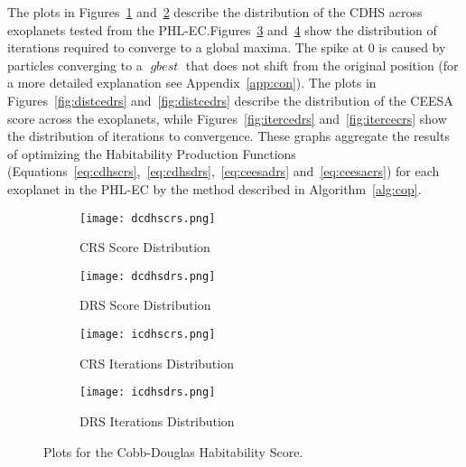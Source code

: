 \documentclass[9pt]{article}
\DeclareMathOperator*{\gbest}{\mathit{gbest}}
\begin{document}
The plots in Figures~\ref{fig:distcdcrs} and~\ref{fig:distcddrs} describe the distribution of the CDHS across exoplanets
tested from the PHL-EC.\@ Figures~\ref{fig:itercdcrs} and~\ref{fig:itercddrs} show the distribution of iterations
required to converge to a global maxima. The spike at 0 is caused by particles converging to a $\gbest$ that does not
shift from the original position (for a more detailed explanation see Appendix~\ref{app:con}). The plots in
Figures~\ref{fig:distcedrs} and~\ref{fig:distcedrs} describe the distribution of the CEESA score across the exoplanets,
while Figures~\ref{fig:itercedrs} and~\ref{fig:itercecrs} show the distribution of iterations to convergence. These
graphs aggregate the results of optimizing the Habitability Production Functions
(Equations~\ref{eq:cdhscrs},~\ref{eq:cdhsdrs},~\ref{eq:ceesadrs} and~\ref{eq:ceesacrs}) for each exoplanet in the PHL-EC
by the method described in Algorithm~\ref{alg:cop}.


\begin{figure}
  \centering
  \begin{subfigure}[b]{0.4\textwidth}
    \texttt{[image: dcdhscrs.png]}
    \caption{CRS Score Distribution}\label{fig:distcdcrs}
  \end{subfigure}
  \quad
  \begin{subfigure}[b]{0.4\textwidth}
    \texttt{[image: dcdhsdrs.png]}
    \caption{DRS Score Distribution}\label{fig:distcddrs}
  \end{subfigure}

  \begin{subfigure}[b]{0.4\textwidth}
    \texttt{[image: icdhscrs.png]}
    \caption{CRS Iterations Distribution}\label{fig:itercdcrs}
  \end{subfigure}
  \quad
  \begin{subfigure}[b]{0.4\textwidth}
    \texttt{[image: icdhsdrs.png]}
    \caption{DRS Iterations Distribution}\label{fig:itercddrs}
  \end{subfigure}
  \caption{Plots for the Cobb-Douglas Habitability Score.}\label{fig:cdhs}
\end{figure}
\end{document}
